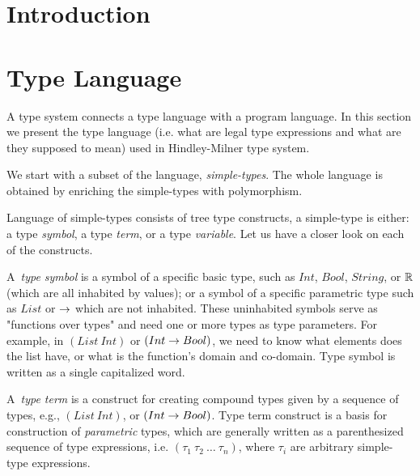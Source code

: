 \documentclass[a4paper,oneside]{memoir}
\begin{document}

\section{Introduction}


\section{Type Language}
\label{sec:typelang}


A type system connects a type language with a program language.
In this section we present the type language (i.e. what are legal type expressions and what are they supposed to mean) used in Hindley-Milner type system.

We start with a subset of the language, \textit{simple-types}.
The whole language is obtained by enriching the simple-types with polymorphism.

Language of simple-types consists of tree type constructs, a simple-type is either: 
a type \textit{symbol}, 
a type \textit{term}, 
or a type \textit{variable}.
Let us have a closer look on each of the constructs.

A~\textit{type symbol} is a symbol of a specific basic type, such as 
$Int$, $Bool$, $String$, or $\mathbb{R}$ (which are all inhabited by values); 
or a symbol of a specific parametric type such as $List$ or $\rightarrow$ 
which are not inhabited. These uninhabited symbols serve as "functions over types" 
and need one or more types as type parameters. For example, in $(List~Int)$
or $(Int \rightarrow Bool)$, we need to know what elements does the list have, 
or what is the function's domain and co-domain. Type symbol is written as 
a single capitalized word.

A~\textit{type term} is a construct for creating compound types given 
by a sequence of types, e.g., $(List~Int)$, or $(Int \rightarrow Bool)$. 
Type term construct is a basis for construction of \textit{parametric} types,
which are generally written as a parenthesized sequence of type expressions, 
i.e. $(\tau_1~\tau_2~\dots~\tau_n)$, where $\tau_i$ are arbitrary 
simple-type expressions.
\end{document}
